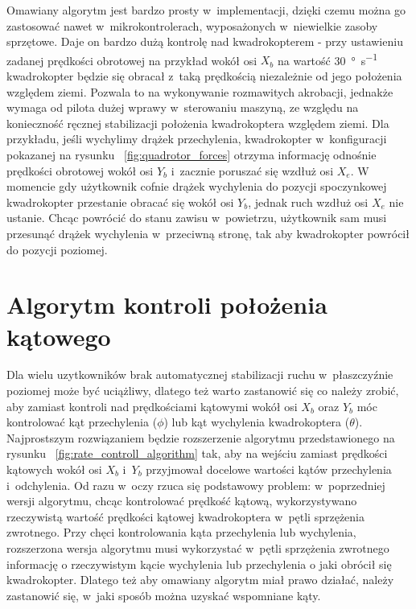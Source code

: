 Omawiany algorytm jest bardzo prosty w~implementacji, dzięki czemu można go zastosować nawet w~mikrokontrolerach, wyposażonych w~niewielkie zasoby sprzętowe. Daje on bardzo dużą kontrolę nad kwadrokopterem - przy ustawieniu zadanej prędkości obrotowej na przykład wokół osi $X_b$ na wartość \SI{30}{\degree\per\second} kwadrokopter będzie się obracał z~taką prędkością niezależnie od jego położenia względem ziemi. Pozwala to na wykonywanie rozmawitych akrobacji, jednakże wymaga od pilota dużej wprawy w~sterowaniu maszyną, ze względu na konieczność ręcznej stabilizacji położenia kwadrokoptera względem ziemi. Dla przykładu, jeśli wychylimy drążek przechylenia, kwadrokopter w~konfiguracji pokazanej na rysunku  ~\ref{fig:quadrotor_forces} otrzyma informację odnośnie prędkości obrotowej wokół osi $Y_b$ i~zacznie poruszać się wzdłuż osi $X_e$. W momencie gdy użytkownik cofnie drążek wychylenia do pozycji spoczynkowej kwadrokopter przestanie obracać się  wokół osi $Y_b$, jednak ruch wzdłuż osi $X_e$ nie ustanie. Chcąc powrócić do stanu zawisu w~powietrzu, użytkownik sam musi przesunąć drążek wychylenia w~przeciwną stronę, tak aby kwadrokopter powrócił do pozycji poziomej. 

\section{Algorytm kontroli położenia kątowego}

Dla wielu uzytkowników brak automatycznej stabilizacji ruchu w~płaszczyźnie poziomej może być uciążliwy, dlatego też warto zastanowić się co należy zrobić, aby zamiast kontroli nad prędkościami kątowymi wokół osi $X_b$ oraz $Y_b$ móc kontrolować kąt przechylenia ($\phi$) lub kąt wychylenia kwadrokoptera ($\theta$). Najprostszym rozwiązaniem będzie rozszerzenie algorytmu przedstawionego na rysunku ~\ref{fig:rate_controll_algorithm} tak, aby na wejściu zamiast prędkości kątowych wokół osi $X_b$ i~$Y_b$ przyjmował docelowe wartości kątów przechylenia i~odchylenia. Od razu w~oczy rzuca się podstawowy problem: w~poprzedniej wersji algorytmu, chcąc kontrolować prędkość kątową, wykorzystywano rzeczywistą wartość prędkości kątowej kwadrokoptera w~pętli sprzężenia zwrotnego. Przy chęci kontrolowania kąta przechylenia lub wychylenia, rozszerzona wersja algorytmu musi wykorzystać w~pętli sprzężenia zwrotnego informację o rzeczywistym kącie wychylenia lub przechylenia o jaki obrócił się kwadrokopter. Dlatego też aby omawiany algorytm miał prawo działać, należy zastanowić się, w~jaki sposób można uzyskać wspomniane kąty.  

